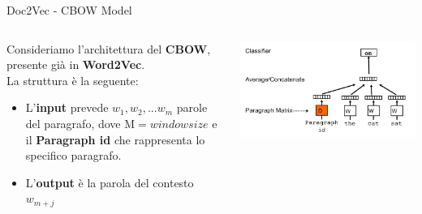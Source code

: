\documentclass[british]{beamer}
\begin{document}
\begin{frame}{Doc2Vec - CBOW Model}
	\begin{columns}
		\begin{column}{0.5\textwidth}
			Consideriamo l'architettura del \textbf{CBOW}, presente gi\`{a} in \textbf{Word2Vec}. \\
			La struttura \`{e} la seguente:
			\begin{itemize}
				\item L'\textbf{input} prevede $w_{1},w_{2},...w_{m}$ parole del paragrafo, dove $\mathrm{M} = window size$ e il \textbf{Paragraph id} che rappresenta lo specifico paragrafo.
				\item L'\textbf{output} \`{e} la parola del contesto $w_{m+j}$
			\end{itemize}
		\end{column}
		\begin{column}{0.5\linewidth}
			\includegraphics[width= 1.01\linewidth]{./Imgs/d2v-cbow.png}
		\end{column}
	\end{columns}
\end{frame}
\end{document}
